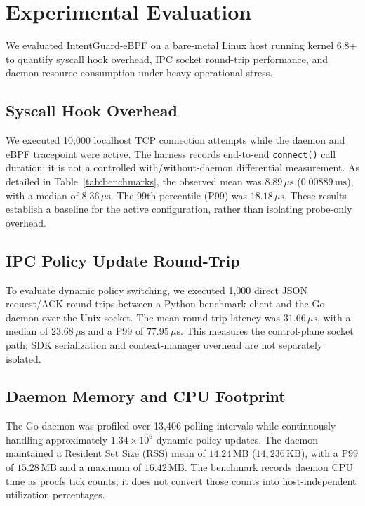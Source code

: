 \documentclass[conference]{IEEEtran}
\begin{document}
\section{Experimental Evaluation}

We evaluated IntentGuard-eBPF on a bare-metal Linux host running kernel 6.8+ to quantify syscall hook overhead, IPC socket round-trip performance, and daemon resource consumption under heavy operational stress.

\subsection{Syscall Hook Overhead}
We executed 10,000 localhost TCP connection attempts while the daemon and eBPF tracepoint were active. The harness records end-to-end \texttt{connect()} call duration; it is not a controlled with/without-daemon differential measurement. As detailed in Table~\ref{tab:benchmarks}, the observed mean was $8.89\,\mu\text{s}$ ($0.00889\,\text{ms}$), with a median of $8.36\,\mu\text{s}$. The 99th percentile (P99) was $18.18\,\mu\text{s}$. These results establish a baseline for the active configuration, rather than isolating probe-only overhead.

\subsection{IPC Policy Update Round-Trip}
To evaluate dynamic policy switching, we executed 1,000 direct JSON request/ACK round trips between a Python benchmark client and the Go daemon over the Unix socket. The mean round-trip latency was $31.66\,\mu\text{s}$, with a median of $23.68\,\mu\text{s}$ and a P99 of $77.95\,\mu\text{s}$. This measures the control-plane socket path; SDK serialization and context-manager overhead are not separately isolated.

\subsection{Daemon Memory and CPU Footprint}
The Go daemon was profiled over 13,406 polling intervals while continuously handling approximately $1.34 \times 10^6$ dynamic policy updates. The daemon maintained a Resident Set Size (RSS) mean of $14.24\,\text{MB}$ ($14,236\,\text{KB}$), with a P99 of $15.28\,\text{MB}$ and a maximum of $16.42\,\text{MB}$. The benchmark records daemon CPU time as procfs tick counts; it does not convert those counts into host-independent utilization percentages.
\end{document}

